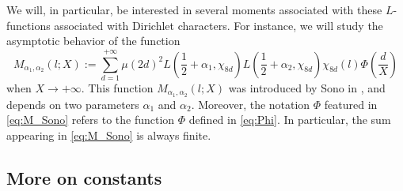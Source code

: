 \documentclass[10pt,a4paper]{amsart}
\theoremstyle{plain}
\theoremstyle{definition}
\theoremstyle{remark}
\begin{document}
We will, in particular, be interested in several moments associated with these $L$-functions associated with Dirichlet characters. For instance, we will study the asymptotic behavior of the function
\begin{equation}
\label{eq:M_Sono}
M_{\alpha_1,\alpha_2}(l;X) := \sum_{d=1}^{+\infty} \mu(2d)^2 L\left( \frac{1}{2} + \alpha_1,\chi_{8d} \right) L\left( \frac{1}{2} + \alpha_2,\chi_{8d} \right) \chi_{8d}(l) \Phi\left( \frac{d}{X} \right)
\end{equation}
when $X \to +\infty$. This function $M_{\alpha_1,\alpha_2}(l;X)$ was introduced by Sono in \cite{sono2020second}, and depends on two parameters $\alpha_1$ and $\alpha_2$. Moreover, the notation $\Phi$ featured in \eqref{eq:M_Sono} refers to the function $\Phi$ defined in \eqref{eq:Phi}. In particular, the sum appearing in \eqref{eq:M_Sono} is always finite.

\subsection{More on constants}
\end{document}
